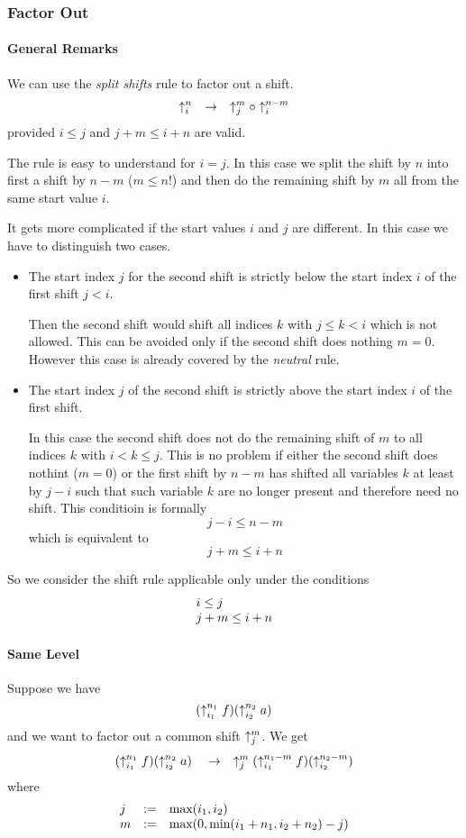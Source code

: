 \subsubsection{Factor Out}


\paragraph{General Remarks}

We can use the \emph{split shifts} rule to factor out a shift.
$$
    \uparrow^{n}_{i} \quad\to\quad \uparrow^{m}_{j} \circ \uparrow^{n - m}_{i}
$$
provided $i \le j$ and $j + m \le i + n$ are valid.

The rule is easy to understand for $i = j$. In this case we split the shift by $n$
into first a shift by $n - m$ ($m \le n$!) and then do the remaining shift by
$m$ all from the same start value $i$.

It gets more complicated if the start values $i$ and $j$ are different. In this
case we have to distinguish two cases.
\begin{itemize}
    \item The start index $j$ for the second shift is strictly below the start
        index $i$ of the first shift $j < i$.

        Then the second shift would shift all
        indices $k$ with $j \le k < i$ which is not allowed. This can be avoided
        only if the second shift does nothing $m = 0$. However this case is
        already covered by the \emph{neutral} rule.

    \item The start index $j$ of the second shift is strictly above the start
        index $i$ of the first shift.

        In this case the second shift does not do the remaining shift of $m$ to
        all indices $k$ with $i < k \le j$. This is no problem if either the
        second shift does nothint ($m = 0$) or the first shift by $n - m$ has
        shifted all variables $k$ at least by $j - i$ such that such variable
        $k$ are no longer present and therefore need no shift. This conditioin
        is formally
        $$
            j - i \le n - m
        $$
        which is equivalent to
        $$
            j + m \le i + n
        $$
\end{itemize}

So we consider the shift rule applicable only under the conditions
$$
\begin{array}{lllll} 
    i \le j
    \\
    j + m \le i + n
 \end{array}
$$


\paragraph{Same Level}

Suppose we have
$$
    (\uparrow^{n_1}_{i_1} f) (\uparrow^{n_2}_{i_2} a)
$$
and we want to factor out a common shift $\uparrow^{m}_{j}$. We get
$$
    (\uparrow^{n_1}_{i_1} f) (\uparrow^{n_2}_{i_2} a)
    \quad \to \quad
    \uparrow^{m}_{j} (\uparrow^{n_1 - m}_{i_1} f) (\uparrow^{n_2 - m}_{i_2})
$$
where
$$
\begin{array}{lllll} 
    j &:=& \text{max}(i_1, i_2)
    \\
    m &:=& \text{max}(0, \text{min}(i_1 + n_1, i_2 + n_2) - j)
 \end{array}
$$
